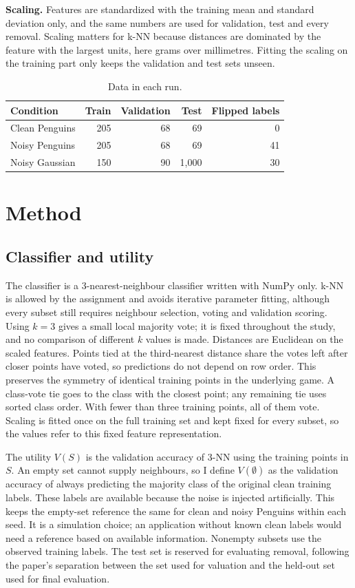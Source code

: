 \documentclass[10pt]{article}
\begin{document}
\textbf{Scaling.} Features are standardized with the training mean and standard deviation only, and the same numbers are used for validation, test and every removal. Scaling matters for k-NN because distances are dominated by the feature with the largest units, here grams over millimetres. Fitting the scaling on the training part only keeps the validation and test sets unseen.

\begin{table}[!ht]
\centering\small
\caption{Data in each run.}
\label{tab:partitions}
\begin{tabular}{@{}lrrrr@{}}
\toprule
Condition & Train & Validation & Test & Flipped labels \\
\midrule
Clean Penguins & 205 & 68 & 69 & 0 \\
Noisy Penguins & 205 & 68 & 69 & 41 \\
Noisy Gaussian & 150 & 90 & 1,000 & 30 \\
\bottomrule
\end{tabular}
\end{table}

\section{Method}
\subsection{Classifier and utility}
The classifier is a 3-nearest-neighbour classifier written with NumPy only. k-NN is allowed by the assignment and avoids iterative parameter fitting, although every subset still requires neighbour selection, voting and validation scoring. Using $k=3$ gives a small local majority vote; it is fixed throughout the study, and no comparison of different $k$ values is made. Distances are Euclidean on the scaled features. Points tied at the third-nearest distance share the votes left after closer points have voted, so predictions do not depend on row order. This preserves the symmetry of identical training points in the underlying game. A class-vote tie goes to the class with the closest point; any remaining tie uses sorted class order. With fewer than three training points, all of them vote. Scaling is fitted once on the full training set and kept fixed for every subset, so the values refer to this fixed feature representation.

The utility $V(S)$ is the validation accuracy of 3-NN using the training points in $S$. An empty set cannot supply neighbours, so I define $V(\emptyset)$ as the validation accuracy of always predicting the majority class of the original clean training labels. These labels are available because the noise is injected artificially. This keeps the empty-set reference the same for clean and noisy Penguins within each seed. It is a simulation choice; an application without known clean labels would need a reference based on available information. Nonempty subsets use the observed training labels. The test set is reserved for evaluating removal, following the paper's separation between the set used for valuation and the held-out set used for final evaluation.
\end{document}
